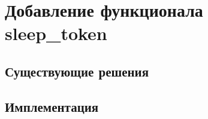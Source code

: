 \section{Добавление функционала sleep\_token}\label{sleep_token}
\subsection{Существующие решения}
 \subsection{Имплементация}
